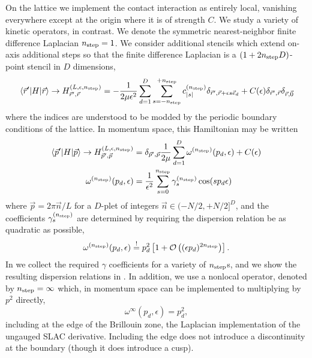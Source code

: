 On the lattice we implement the contact interaction as entirely local, vanishing everywhere except at the origin where it is of strength $C$.  We study a variety of kinetic operators, in contrast.  We denote the symmetric nearest-neighbor finite difference Laplacian ${n_\text{step}}=1$.  We consider additional stencils which extend on-axis additional steps so that the finite difference Laplacian is a $(1+2{n_\text{step}} D)$-point stencil in $D$ dimensions,
\begin{equation}
    \left\langle \vec{r}' \middle| H \middle| \vec{r} \right\rangle
    \rightarrow
    H_{\vec{r}',\vec{r}}^{(L,\epsilon,{n_\text{step}})}
    = - \frac{1}{2 \mu \epsilon^2} \sum_{d=1}^{D} \sum_{s=-{n_\text{step}}}^{+{n_\text{step}}} c^{({n_\text{step}})}_{|s|} \delta_{\vec{r}',\vec{r}+\epsilon s \vec{e}_d} + C(\epsilon) \delta_{\vec{r}',\vec{r}}\delta_{\vec{r},\vec{0}}
\end{equation}
where the indices are understood to be modded by the periodic boundary conditions of the lattice.
In momentum space, this Hamiltonian may be written
\begin{align}
    \label{eq:p space hamiltonian}
    \left\langle \vec{p}' \middle| H \middle| \vec{p} \right\rangle
    \rightarrow
    H_{\vec{p}',\vec{p}}^{(L,\epsilon,{n_\text{step}})}
    &= \delta_{\vec{p}',\vec{p}} \frac{1}{2\mu} \sum_{d=1}^{D} \omega^{({n_\text{step}})}(p_d,\epsilon) + C(\epsilon)
    \\
    \label{eq:gamma definition}
    \omega^{({n_\text{step}})}(p_d,\epsilon)
    &= \frac{1}{\epsilon^2} \sum_{s=0}^{{n_\text{step}}} \gamma_{s}^{({n_\text{step}})} \cos(s p_d \epsilon)
\end{align}
where $\vec{p} = 2\pi \vec{n}/L$ for a $D$-plet of integers $\vec{n} \in (-N/2, +N/2]^D$, and the coefficients $\gamma_{s}^{({n_\text{step}})}$ are determined by requiring the dispersion relation be as quadratic as possible,
\begin{equation}
    \label{eq:gamma determination}
    \omega^{({n_\text{step}})}(p_d,\epsilon) \overset{!}{=} p_d^2 \left[ 1 + \mathcal{O}\left((\epsilon p_d)^{2{n_\text{step}}}\right)\right].
\end{equation}
In  we collect the required $\gamma$ coefficients for a variety of ${n_\text{step}}$s, and we show the resulting dispersion relations in .
In addition, we use a nonlocal operator, denoted by ${n_\text{step}}=\infty$ which, in momentum space can be implemented to multiplying by $p^2$ directly,
\begin{equation}
    \omega^{\infty}(p_d,\epsilon) = p_d^2,
\end{equation}
including at the edge of the Brillouin zone, the Laplacian implementation of the ungauged SLAC derivative.
Including the edge does not introduce a discontinuity at the boundary (though it does introduce a cusp).

